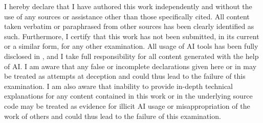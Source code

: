 \documentclass[11pt]{article}
\begin{document}
I hereby declare that I have authored this work independently and
without the use of any sources or assistance other than those
specifically cited. All content taken verbatim or paraphrased from
other sources has been clearly identified as such. Furthermore, I
certify that this work has not been submitted, in its current or a
similar form, for any other examination. All usage of AI tools has
been fully disclosed in , and I take full
responsibility for all content generated with the help of AI. I am
aware that any false or incomplete declarations given here or in
 may be treated as attempts at deception and
could thus lead to the failure of this examination. I am also aware
that inability to provide in-depth technical explanations for any
content contained in this work or in the underlying source code may
be treated as evidence for illicit AI usage or misappropriation of
the work of others and could thus lead to the failure of this examination.

\end{document}
